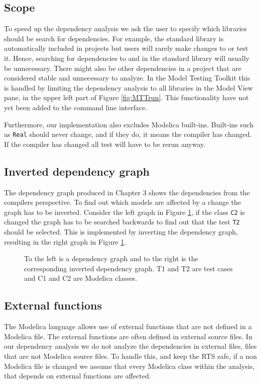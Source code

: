 \documentclass{cslthse-msc}
\begin{document}
\subsection{Scope}
To speed up the dependency analysis we ask the user to specify which libraries should be search for dependencies. For example, the standard library is automatically included in projects but users will rarely make changes to or test it. Hence, searching for dependencies to and in the standard library will usually be unnecessary. There might also be other dependencies in a project that are considered stable and unnecessary to analyze. In the Model Testing Toolkit this is handled by limiting the dependency analysis to all libraries in the Model View pane, in the upper left part of Figure \ref{fig:MTTrun}. This functionality have not yet been added to the command line interface.

Furthermore, our implementation also excludes Modelica built-ins. Built-ins such as \texttt{Real} should never change, and if they do, it means the compiler has changed. If the compiler has changed all test will have to be rerun anyway.

\subsection{Inverted dependency graph}
The dependency graph produced in Chapter 3 shows the dependencies from the compilers perspective. To find out which models are affected by a change the graph has to be inverted. Consider the left graph in Figure \ref{fig:invertedGraph}, if the class \texttt{C2} is changed the graph has to be searched backwards to find out that the test \texttt{T2} should be selected. This is implemented by inverting the dependency graph, resulting in the right graph in Figure \ref{fig:invertedGraph}.

\begin{figure}[!htbp]
    \centering
    \qquad
    \caption{To the left is a dependency graph and to the right is the corresponding inverted dependency graph. T1 and T2 are test cases and C1 and C2 are Modelica classes.}
    \label{fig:invertedGraph}
\end{figure}

\subsection{External functions}
The Modelica language allows use of external functions that are not defined in a Modelica file. The external functions are often defined in external source files\cite{modelicamodelica}. In our dependency analysis we do not analyze the dependencies in external files, files that are not Modelica source files. To handle this, and keep the RTS safe, if a non Modelica file is changed we assume that every Modelica class within the analysis, that depends on external functions are affected.
\end{document}
